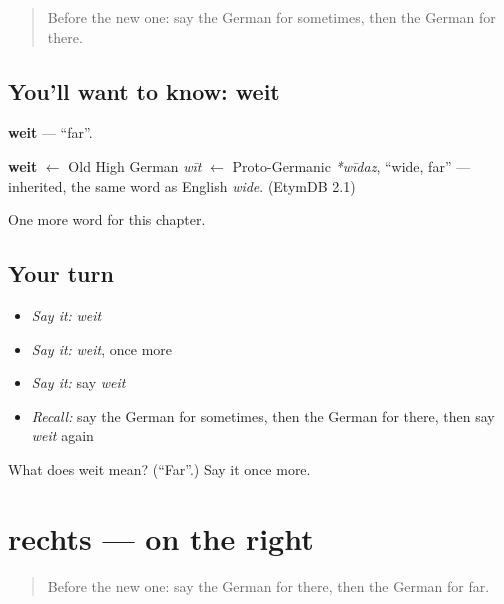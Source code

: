 \label{lesson:GE-C95-weit}



\begin{quote}
Before the new one: say the German for sometimes, then the German for there.
\end{quote}

\subsection*{You'll want to know: weit}
\textbf{weit} — \textquotedblleft{}far\textquotedblright{}.

\begin{cousinweb}
\textbf{weit} $\leftarrow$ Old High German \emph{wīt} $\leftarrow$ Proto-Germanic \emph{*wīdaz}, \textquotedblleft{}wide, far\textquotedblright{} — inherited, the same word as English \emph{wide}. (EtymDB 2.1)
\end{cousinweb}

\begin{grammarlens}[title={What you've built}]
One more word for this chapter.
\end{grammarlens}

\subsection*{Your turn}
\begin{itemize}
\raggedright
  \item \emph{Say it:} \emph{weit}
  \item \emph{Say it:} \emph{weit}, once more
  \item \emph{Say it:} say \emph{weit}
  \item \emph{Recall:} say the German for sometimes, then the German for there, then say \emph{weit} again
\end{itemize}

\begin{tcolorbox}[breakable,colback=teal!4,colframe=teal!35!black,title={Before you move on}]
What does weit mean? (\textquotedblleft{}Far\textquotedblright{}.) Say it once more.
\end{tcolorbox}
\section[rechts]{rechts — on the right}

\label{lesson:GE-C95-rechts}



\begin{quote}
Before the new one: say the German for there, then the German for far.
\end{quote}

